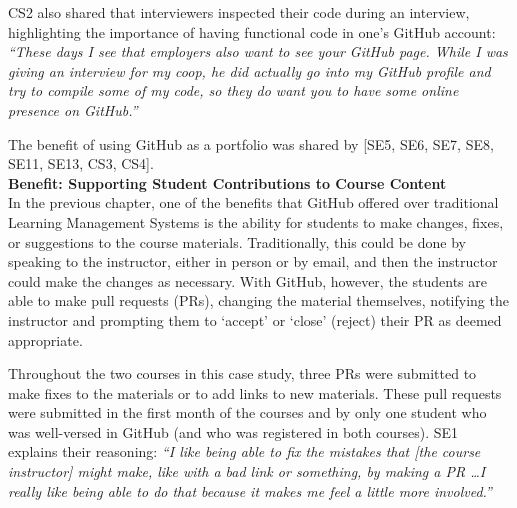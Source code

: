 CS2 also shared that interviewers inspected their code during an interview, highlighting the importance of having functional code in one's GitHub account: \textit{``These days I see that employers also want to see your GitHub page. While I was giving an interview for my coop, he did actually go into my GitHub profile and try to compile some of my code, so they do want you to have some online presence on GitHub.''}


The benefit of using GitHub as a portfolio was shared by [SE5, SE6, SE7, SE8, SE11, SE13, CS3, CS4]. \\

\textbf{Benefit: Supporting Student Contributions to Course Content} \\
In the previous chapter, one of the benefits that GitHub offered over traditional Learning Management Systems is the ability for students to make changes, fixes, or suggestions to the course materials. Traditionally, this could be done by speaking to the instructor, either in person or by email, and then the instructor could make the changes as necessary. With GitHub, however, the students are able to make pull requests (PRs), changing the material themselves, notifying the instructor and prompting them to `accept' or `close' (reject) their PR as deemed appropriate.

Throughout the two courses in this case study, three PRs were submitted to make fixes to the materials or to add links to new materials. These pull requests were submitted in the first month of the courses and by only one student who was well-versed in GitHub (and who was registered in both courses). SE1 explains their reasoning: \textit{``I like being able to fix the mistakes that [the course instructor] might make, like with a bad link or something, by making a PR \ldots I really like being able to do that because it makes me feel a little more involved.''}

